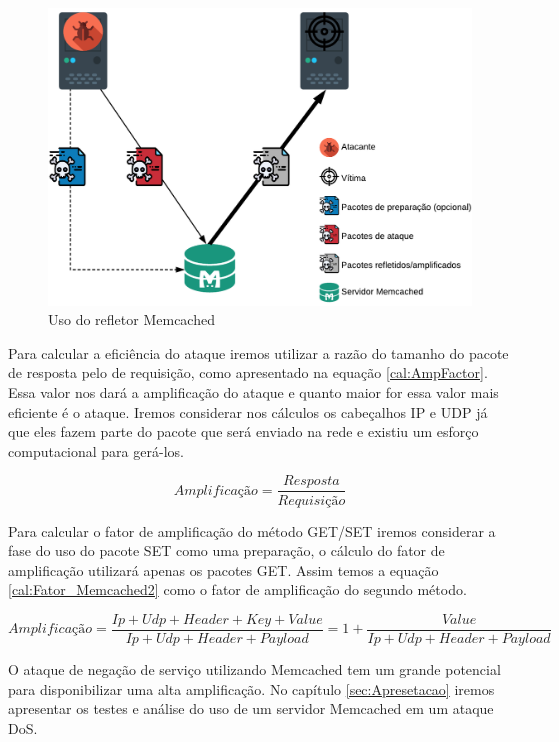 \begin{figure}[H]
     \centering
     \includegraphics[scale=0.6]{img/DDoS_Memcached.pdf}
     \caption{Uso do refletor Memcached}
     \label{img:Status_Code}
\end{figure}

Para calcular a eficiência do ataque iremos utilizar a razão do tamanho do pacote de resposta pelo de requisição, como apresentado na equação \ref{cal:AmpFactor}. Essa valor nos dará a amplificação do ataque e quanto maior for essa valor mais eficiente é o ataque. Iremos considerar nos cálculos os cabeçalhos IP e UDP já que eles fazem parte do pacote que será enviado na rede e existiu um esforço computacional para gerá-los.

\begin{equation}
Amplificação = \frac{Resposta}{Requisição}
\label{cal:AmpFactor}
\end{equation}

Para calcular o fator de amplificação do método GET/SET iremos considerar a fase do uso do pacote SET como uma preparação, o cálculo do fator de amplificação utilizará apenas os pacotes GET. Assim temos a equação \ref{cal:Fator_Memcached2} como o fator de amplificação do segundo método.

\begin{equation}
Amplificação = \frac{Ip + Udp + Header + Key + Value}{Ip + Udp + Header + Payload} = 1 + \frac{Value}{Ip + Udp +Header + Payload}
\label{cal:Fator_Memcached2}
\end{equation}

O ataque de negação de serviço utilizando Memcached tem um grande potencial para disponibilizar uma alta amplificação. No capítulo \ref{sec:Apresetacao} iremos apresentar os testes e análise do uso de um servidor Memcached em um ataque DoS.